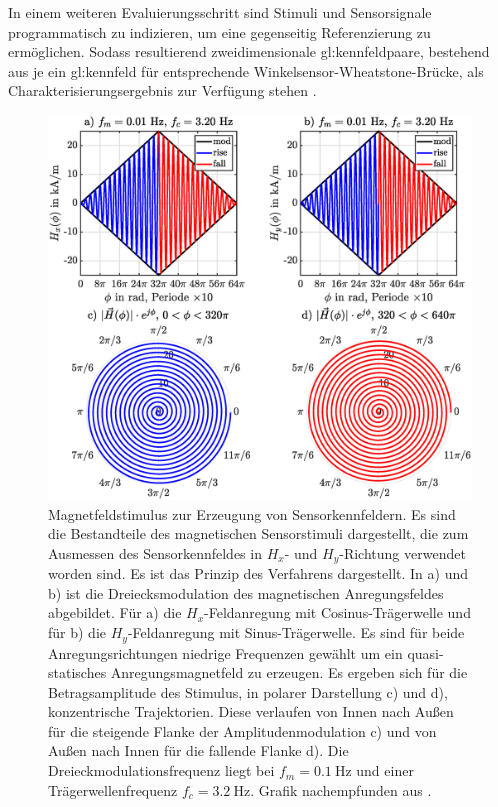 \newline
In einem weiteren Evaluierungsschritt sind Stimuli und Sensorsignale programmatisch zu indizieren, um eine gegenseitig Referenzierung zu ermöglichen. Sodass resultierend zweidimensionale \gls{gl:kennfeldpaar}e, bestehend aus je ein \gls{gl:kennfeld} für entsprechende Winkelsensor-Wheatstone-Brücke, als Charakterisierungsergebnis zur Verfügung stehen \cite{Schuethe2019}.


\clearpage


\begin{figure}[tbph]
	\centering
	\includegraphics[width=\linewidth]{chapters/images/2-Grundlagen/Magnetfeldstimulus_Kennfeldmethode}
	\caption[Magnetfeldstimulus zur Erzeugung von Sensorkennfeldern]{Magnetfeldstimulus zur Erzeugung von 
		Sensorkennfeldern. Es sind die Bestandteile des magnetischen Sensorstimuli dargestellt, die zum Ausmessen des 
		Sensorkennfeldes in $H_x$- und $H_y$-Richtung verwendet worden sind. Es ist das Prinzip des Verfahrens 
		dargestellt. In a) und b) ist die Dreiecksmodulation des magnetischen Anregungsfeldes abgebildet. Für a) die 
		$H_x$-Feldanregung mit Cosinus-Trägerwelle und für b) die $H_y$-Feldanregung mit Sinus-Trägerwelle. Es sind für 
		beide Anregungsrichtungen niedrige Frequenzen gewählt um ein quasi-statisches Anregungsmagnetfeld zu erzeugen. 
		Es ergeben sich für die Betragsamplitude des Stimulus, in polarer Darstellung c) und d), konzentrische 
		Trajektorien. Diese verlaufen von Innen nach Außen für die steigende Flanke der Amplitudenmodulation c) und von 
		Außen nach Innen für die fallende Flanke d). Die Dreieckmodulationsfrequenz liegt bei $f_m = \SI{0.1}{\hertz}$ 
		und einer Trägerwellenfrequenz $f_c = \SI{3.2}{\hertz}$. Grafik nachempfunden aus \cite{Schuethe2019}.}
	\label{fig:magnetfeldstimuluskennfeldmethode}
\end{figure}


